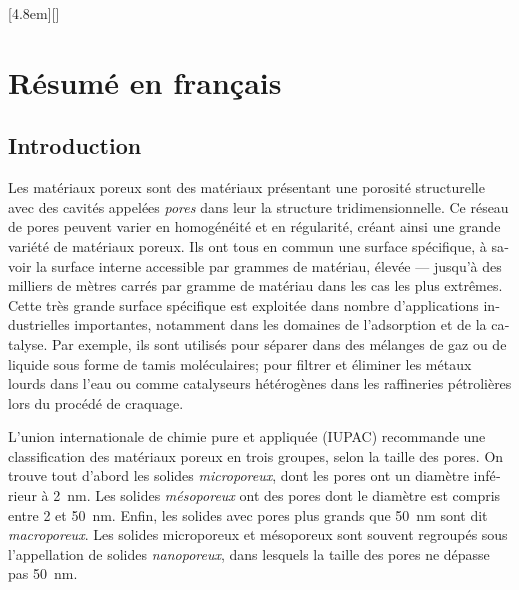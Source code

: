 \documentclass[thesis]{subfiles}
\begin{document}
\begin{otherlanguage}{french}

\renewcommand{\thesection}{\arabic{section}}
\renewcommand{\thesubsection}{\arabic{section}.\arabic{subsection}}
\renewcommand{\thefigure}{R\arabic{figure}}
\setcounter{figure}{0}
[4.8em]{\addvspace{0.1em}}{\contentslabel{2.2em}}{}{\contentspage}[]

\chapter*{Résumé en français}
\startcontents[chapters]
\printpartialtoc

\section*{Introduction}

Les matériaux poreux sont des matériaux présentant une porosité structurelle
avec des cavités appelées \emph{pores} dans leur la structure tridimensionnelle.
Ce réseau de pores peuvent varier en homogénéité et en régularité, créant ainsi
une grande variété de matériaux poreux. Ils ont tous en commun une surface
spécifique, à savoir la surface interne accessible par grammes de matériau,
élevée --- jusqu'à des milliers de mètres carrés par gramme de
matériau\cite{Farha2012} dans les cas les plus extrêmes. Cette très grande
surface spécifique est exploitée dans nombre d'applications industrielles
importantes, notamment dans les domaines de l'adsorption et de la catalyse. Par
exemple, ils sont utilisés pour séparer dans des mélanges de gaz ou de liquide
sous forme de tamis moléculaires; pour filtrer et éliminer les métaux lourds
dans l'eau ou comme catalyseurs hétérogènes dans les raffineries pétrolières
lors du procédé de craquage.

L'union internationale de chimie pure et appliquée (IUPAC) recommande une
classification des matériaux poreux en trois groupes, selon la taille des
pores\cite{Rouquerol1994}. On trouve tout d'abord les solides
\emph{microporeux}, dont les pores ont un diamètre inférieur à \SI{2}{nm}. Les
solides \emph{mésoporeux} ont des pores dont le diamètre est compris entre 2 et
\SI{50}{nm}. Enfin, les solides avec pores plus grands que \SI{50}{nm} sont dit
\emph{macroporeux}. Les solides microporeux et mésoporeux sont souvent regroupés
sous l'appellation de solides \emph{nanoporeux}, dans lesquels la taille des
pores ne dépasse pas \SI{50}{nm}.


\end{otherlanguage}
\end{document}
